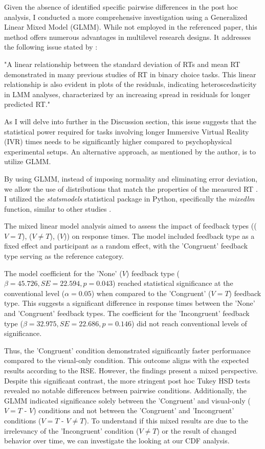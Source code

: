 \documentclass[12pt,oneside,openright]{report}
\begin{document}
Given the absence of identified specific pairwise differences in the post hoc analysis, I conducted a more comprehensive investigation using a Generalized Linear Mixed Model (GLMM). While not employed in the referenced paper, this method offers numerous advantages in multilevel research designs. It addresses the following issue stated by \textcite{Lo2015-fv}: 

"A linear relationship between the standard deviation of RTs and mean RT demonstrated in many previous studies of RT in binary choice tasks. This linear relationship is also evident in plots of the residuals, indicating heteroscedasticity in LMM analyses, characterized by an increasing spread in residuals for longer predicted RT."

As I will delve into further in the Discussion section, this issue suggests that the statistical power required for tasks involving longer Immersive Virtual Reality (IVR) times needs to be significantly higher compared to psychophysical experimental setups. An alternative approach, as mentioned by the author, is to utilize GLMM.

By using GLMM, instead of imposing normality and eliminating error deviation, we allow the use of distributions that match the properties of the measured RT \parencite{Lo2015-fv}. I utilized the \textit{statsmodels} statistical package in Python, specifically the \textit{mixedlm} function, similar to other studies \parencite{RSE_FBI}.

The mixed linear model analysis aimed to assess the impact of feedback types (($V=T$), ($V \neq T$), ($V$)) on response times. The model included feedback type as a fixed effect and participant as a random effect, with the 'Congruent' feedback type serving as the reference category.

The model coefficient for the 'None' ($V$) feedback type ($\beta = 45.726, SE = 22.594, p = 0.043$) reached statistical significance at the conventional level ($\alpha =0.05 $) when compared to the 'Congruent' ($V=T$) feedback type. This suggests a significant difference in response times between the 'None' and 'Congruent' feedback types. The coefficient for the 'Incongruent' feedback type ($\beta = 32.975, SE = 22.686, p = 0.146$) did not reach conventional levels of significance.

Thus, the 'Congruent' condition demonstrated significantly faster performance compared to the visual-only condition. This outcome aligns with the expected results according to the RSE. However, the findings present a mixed perspective. Despite this significant contrast, the more stringent post hoc Tukey HSD tests revealed no notable differences between pairwise conditions. Additionally, the GLMM indicated significance solely between the 'Congruent' and visual-only ($V=T$ - $V$) conditions and not between the 'Congruent' and 'Incongruent' conditions ($V=T$ - $V \neq T$). To understand if this mixed results are due to the irrelevancy of the 'Incongruent' condition ($V \neq T$) or the result of changed behavior over time, we can investigate the looking at our CDF analysis.
\end{document}
